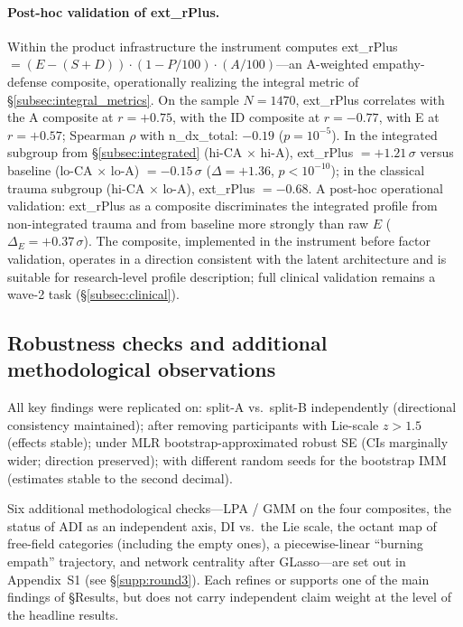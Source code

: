 \paragraph{Post-hoc validation of ext\_rPlus.} Within the product infrastructure the instrument computes ext\_rPlus $= (E - (S + D)) \cdot (1 - P/100) \cdot (A/100)$---an A-weighted empathy-defense composite, operationally realizing the integral metric of §\ref{subsec:integral_metrics}. On the sample $N = 1470$, ext\_rPlus correlates with the A composite at $r = +0.75$, with the ID composite at $r = -0.77$, with E at $r = +0.57$; Spearman $\rho$ with n\_dx\_total: $-0.19$ ($p = 10^{-5}$). In the integrated subgroup from §\ref{subsec:integrated} (hi-CA $\times$ hi-A), ext\_rPlus $= +1.21\,\sigma$ versus baseline (lo-CA $\times$ lo-A) $= -0.15\,\sigma$ ($\Delta = +1.36$, $p < 10^{-10}$); in the classical trauma subgroup (hi-CA $\times$ lo-A), ext\_rPlus $= -0.68$. A post-hoc operational validation: ext\_rPlus as a composite discriminates the integrated profile from non-integrated trauma and from baseline more strongly than raw $E$ ($\Delta_E = +0.37\,\sigma$). The composite, implemented in the instrument before factor validation, operates in a direction consistent with the latent architecture and is suitable for research-level profile description; full clinical validation remains a wave-2 task (§\ref{subsec:clinical}).

\subsection{Robustness checks and additional methodological observations}
\label{subsec:robustness}

All key findings were replicated on: split-A vs.\ split-B independently (directional consistency maintained); after removing participants with Lie-scale $z > 1.5$ (effects stable); under MLR bootstrap-approximated robust SE (CIs marginally wider; direction preserved); with different random seeds for the bootstrap IMM (estimates stable to the second decimal).

Six additional methodological checks---LPA / GMM on the four composites, the status of ADI as an independent axis, DI vs.\ the Lie scale, the octant map of free-field categories (including the empty ones), a piecewise-linear ``burning empath'' trajectory, and network centrality after GLasso---are set out in Appendix~S1 (see §\ref{supp:round3}). Each refines or supports one of the main findings of §Results, but does not carry independent claim weight at the level of the headline results.

